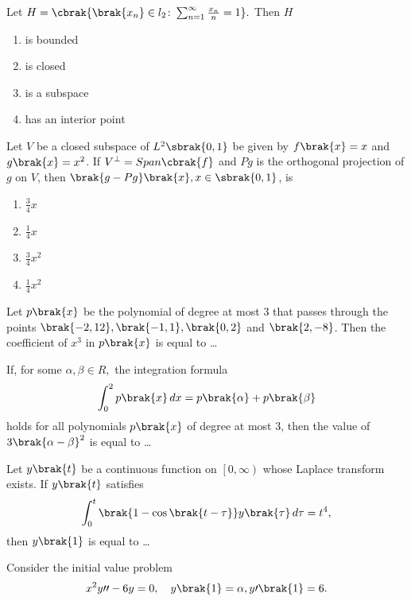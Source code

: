  \iffalse
\chapter{2015}
\author{EE24BTECH11021 - Eshan Ray}
\section{ma}
\fi
    \item Let $H=\cbrak{\brak{x_n}\in l_2\colon\sum_{n=1}^{\infty}\frac{x_n}{n}=1}.$ Then $H$   
    \begin{enumerate}
        \item is bounded
        \item is closed
        \item is a subspace
        \item has an interior point 
    \end{enumerate}
    \item Let $V$ be a closed subspace of $L^2\sbrak{0,1}$ be given by $f\brak{x} =x$ and $g\brak{x}=x^2$. If $V^\perp = Span\cbrak{f} $ and $Pg$ is the orthogonal projection of $g$ on $V$, then $\brak{g-Pg}\brak{x},x\in\sbrak{0,1}$, is
    \begin{enumerate}
        \item $\frac{3}{4}x$
        \item $\frac{1}{4}x$
        \item $\frac{3}{4}x^2$
        \item $\frac{1}{4}x^2$
    \end{enumerate}
    \item Let $p\brak{x}$ be the polynomial of degree at most $3$ that passes through the points $\brak{-2,12},\brak{-1,1},\brak{0,2}$ and $\brak{2,-8}$. Then the coefficient of $x^3$ in $p\brak{x}$ is equal to \dots
    \item If, for some $\alpha,\beta\in R,$ the integration formula 
        $$\int_{0}^{2} p\brak{x}\,dx=p\brak{\alpha}+p\brak{\beta}$$
        holds for all polynomials $p\brak{x}$ of degree at most $3$, then the value of $3\brak{\alpha-\beta}^2$ is equal to \dots
      \item Let $y\brak{t}$ be a continuous function on $\left [0,\infty\right)$ whose Laplace transform exists. If $y\brak{t}$ satisfies 
        $$\int_{0}^{t}\brak{1-\cos\brak{t-\tau}}y\brak{\tau}\,d\tau =t^4,$$
        then $y\brak{1}$ is equal to \dots
    \item Consider the initial value problem 
        $$x^2y\prime\prime-6y=0,\quad y\brak{1}=\alpha,y\prime\brak{1}=6.$$
